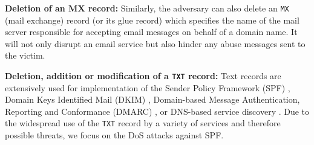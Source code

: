 \textbf{Deletion of an MX record:} Similarly, the adversary can also delete an \texttt{MX} (mail exchange) record (or its glue record) which specifies the name of the mail server responsible for accepting email messages on behalf of a domain name.
It will not only disrupt an email service but also hinder any abuse messages sent to the victim. 

\textbf{Deletion, addition or modification of a \texttt{TXT} record:} Text records are extensively used for implementation of the Sender Policy Framework (SPF) \cite{spf}, Domain Keys Identified Mail (DKIM) \cite{dkim}, Domain-based Message Authentication, Reporting and Conformance (DMARC) \cite{dmarc}, or DNS-based service discovery \cite{rfc6763}.
Due to the widespread use of the \texttt{TXT} record by a variety of services and therefore possible threats, we focus on the DoS attacks against SPF.

